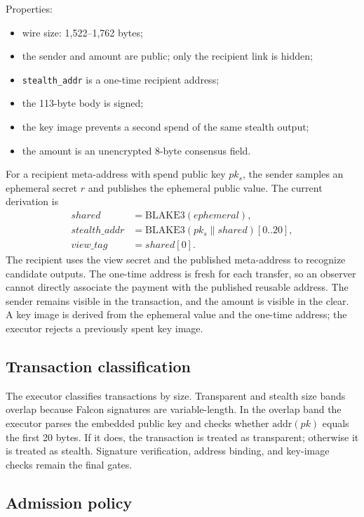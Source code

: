 \documentclass[11pt,a4paper]{article}
\begin{document}
Properties:
\begin{itemize}[leftmargin=*]
  \item wire size: 1,522--1,762 bytes;
  \item the sender and amount are public; only the recipient link is hidden;
  \item \texttt{stealth\_addr} is a one-time recipient address;
  \item the 113-byte body is signed;
  \item the key image prevents a second spend of the same stealth output;
  \item the amount is an unencrypted 8-byte consensus field.
\end{itemize}

For a recipient meta-address with spend public key $pk_s$, the sender samples
an ephemeral secret $r$ and publishes the ephemeral public value. The current
derivation is
\begin{align}
  shared &= \mathrm{BLAKE3}(ephemeral),\\
  stealth\_addr &= \mathrm{BLAKE3}(pk_s \parallel shared)[0..20],\\
  view\_tag &= shared[0].
\end{align}
The recipient uses the view secret and the published meta-address to recognize
candidate outputs. The one-time address is fresh for each transfer, so an
observer cannot directly associate the payment with the published reusable
address. The sender remains visible in the transaction, and the amount is
visible in the clear. A key image is derived from the ephemeral value and the
one-time address; the executor rejects a previously spent key image.

\subsection{Transaction classification}

The executor classifies transactions by size. Transparent and stealth size
bands overlap because Falcon signatures are variable-length. In the overlap
band the executor parses the embedded public key and checks whether
$\mathrm{addr}(pk)$ equals the first 20 bytes. If it does, the transaction is
treated as transparent; otherwise it is treated as stealth. Signature
verification, address binding, and key-image checks remain the final gates.

\subsection{Admission policy}
\end{document}
